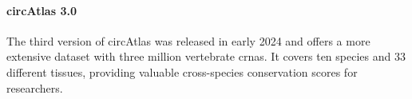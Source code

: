 \paragraph{circAtlas 3.0}
The third version of circAtlas was released in early 2024 and offers a more
extensive dataset with three million vertebrate \glspl{crna}.
It covers ten species and 33 different tissues, providing valuable
cross-species conservation scores for researchers\supercite{wu_circatlas_2023}.
